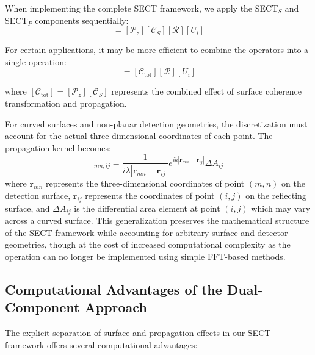 \documentclass[a4paper,12pt]{article}
\begin{document}
When implementing the complete SECT framework, we apply the SECT$_S$ and SECT$_P$ components sequentially:
\begin{equation}
[U_d] = [\mathcal{P}_z][\mathcal{C}_S][\mathcal{R}][U_i]
\end{equation}

For certain applications, it may be more efficient to combine the operators into a single operation:
\begin{equation}
[U_d] = [\mathcal{C}_{\text{tot}}][\mathcal{R}][U_i]
\end{equation}

where $[\mathcal{C}_{\text{tot}}] = [\mathcal{P}_z][\mathcal{C}_S]$ represents the combined effect of surface coherence 
transformation and propagation.

For curved surfaces and non-planar detection geometries, the discretization must account for the actual three-dimensional coordinates of each point. The propagation kernel becomes:
\begin{equation}
[\mathcal{P}_z]_{mn,ij} = \frac{1}{i\lambda |\bm{r}_{mn} - \bm{r}_{ij}|} e^{ik|\bm{r}_{mn} - \bm{r}_{ij}|} \Delta A_{ij}
\end{equation}
where $\bm{r}_{mn}$ represents the three-dimensional coordinates of point $(m,n)$ on the detection surface, $\bm{r}_{ij}$ represents the coordinates of point $(i,j)$ on the reflecting surface, and $\Delta A_{ij}$ is the differential area element at point $(i,j)$ which may vary across a curved surface. This generalization preserves the mathematical structure of the SECT framework while accounting for arbitrary surface and detector geometries, though at the cost of increased computational complexity as the operation can no longer be implemented using simple FFT-based methods.

\subsection{Computational Advantages of the Dual-Component Approach}

The explicit separation of surface and propagation effects in our SECT framework offers several computational advantages:
\end{document}
